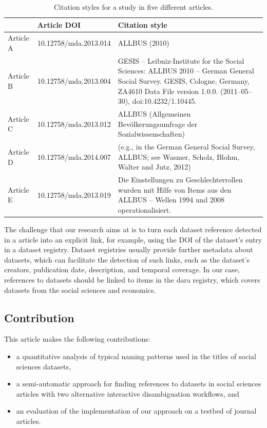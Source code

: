 \documentclass{IOS-Book-Article}
\newcommand{\dara}{\textsf{da\textbar ra}}
\begin{document}
\begin{table}[h!]
	\renewcommand{\arraystretch}{2}
	\centering
	\begin{tabular}{p{1cm}p{3cm}p{7cm}}
		\hline
		& \bf Article DOI & \bf Citation style \\
		\hline
		Article A  & 10.12758/mda.2013.014 &ALLBUS (2010)\\
		
		Article B  & 10.12758/mda.2013.004 &GESIS -- Leibniz-Institute for the Social Sciences: ALLBUS 2010 -- German General Social Survey. GESIS, Cologne, Germany, ZA4610 Data File version 1.0.0. (2011--05--30), doi:10.4232/1.10445. \\ 
		
		Article C & 10.12758/mda.2013.012 &ALLBUS (Allgemeinen Bev\"olkerungsumfrage der Sozialwissenschaften)\\
		
		Article D & 10.12758/mda.2014.007 &(e.g., in the German General Social Survey, ALLBUS; see Wasmer, Scholz, Blohm, Walter and Jutz, 2012)\\
		
		Article E & 10.12758/mda.2013.019 & Die Einstellungen zu Geschlechterrollen wurden mit Hilfe von Items aus den ALLBUS -- Wellen 1994 und 2008 operationalisiert.\\\hline
	\end{tabular}
	\caption{Citation styles for a study in five different articles.}
	\label{table:citation-variety}
\end{table}

The challenge that our research aims at is to turn each dataset reference detected in a article into an explicit link, for example, using the DOI of the dataset's entry in a dataset registry. 
Dataset registries usually provide further metadata about datasets, which can facilitate the detection of such links, such as the dataset's creators, publication date, description, and temporal coverage.
In our case, references to datasets should be linked to items in the {\dara} registry, which covers datasets from the social sciences and economics.

\subsection{Contribution}

This article makes the following contributions:
\begin{itemize}
\item a quantitative analysis of typical naming patterns used in the titles of social sciences datasets,
\item a semi-automatic approach for finding references to datasets in social sciences articles with two alternative interactive disambiguation workflows, and
\item an evaluation of the implementation of our approach on a testbed of journal articles.  
\end{itemize}
\end{document}
